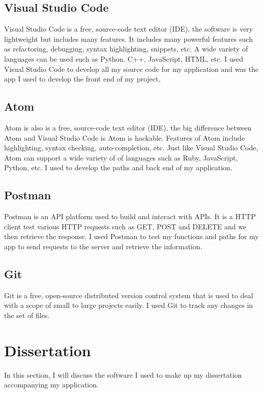 \subsection{Visual Studio Code}

Visual Studio Code is a free, source-code text editor (IDE), the software is very lightweight but includes many features. It includes many powerful features such as refactoring, debugging, syntax highlighting, snippets, etc. A wide variety of languages can be used such as Python. C++, JavaScript, HTML, etc. I used Visual Studio Code to develop all my source code for my application and was the app I used to develop the front end of my project,

\subsection{Atom}

Atom is also is a free, source-code text editor (IDE), the big difference between Atom and Visual Studio Code is Atom is hackable. Features of Atom include highlighting, syntax checking, auto-completion, etc. Just like Visual Studio Code, Atom can support a wide variety of of languages such as Ruby, JavaScript, Python, etc. I used to develop the paths and back end of my application.

\subsection{Postman}

Postman is an API platform used to build and interact with APIs. It is a HTTP client test various HTTP requests such as GET, POST and DELETE and we then retrieve the response. I used Postman to test my functions and paths for my app to send requests to the server and retrieve the information.

\subsection{Git}

Git is a free, open-source distributed version control system that is used to deal with a scope of small to large projects easily. I used Git to track any changes in the set of files.

\section{Dissertation}

In this section, I will discuss the software I used to make up my dissertation accompanying my application.

